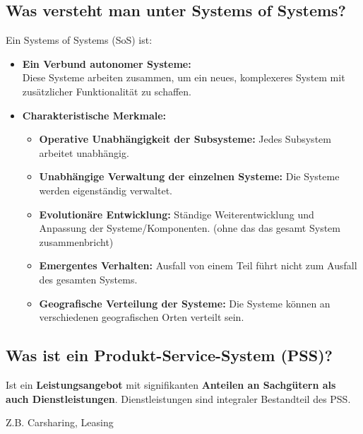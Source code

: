 \subsection{Was versteht man unter Systems of Systems?}
Ein Systems of Systems (SoS) ist:
\begin{itemize}
	\item \textbf{Ein Verbund autonomer Systeme:} 
	\\Diese Systeme arbeiten zusammen, um ein neues, komplexeres System mit zusätzlicher Funktionalität zu schaffen.
	
	\item \textbf{Charakteristische Merkmale:}
	\begin{itemize}
		\item \textbf{Operative Unabhängigkeit der Subsysteme:} Jedes Subsystem arbeitet unabhängig.
		\item \textbf{Unabhängige Verwaltung der einzelnen Systeme:} Die Systeme werden eigenständig verwaltet.
		\item \textbf{Evolutionäre Entwicklung:} Ständige Weiterentwicklung und Anpassung der Systeme/Komponenten. (ohne das das gesamt System zusammenbricht)
		\item \textbf{Emergentes Verhalten:} Ausfall von einem Teil führt nicht zum Ausfall des gesamten Systems.
		\item \textbf{Geografische Verteilung der Systeme:} Die Systeme können an verschiedenen geografischen Orten verteilt sein.
	\end{itemize}
\end{itemize}


\subsection{Was ist ein Produkt-Service-System (PSS)? }
Ist ein \textbf{Leistungsangebot} mit signifikanten \textbf{Anteilen an Sachgütern als auch Dienstleistungen}. Dienstleistungen sind integraler Bestandteil des PSS. 

Z.B. Carsharing, Leasing

